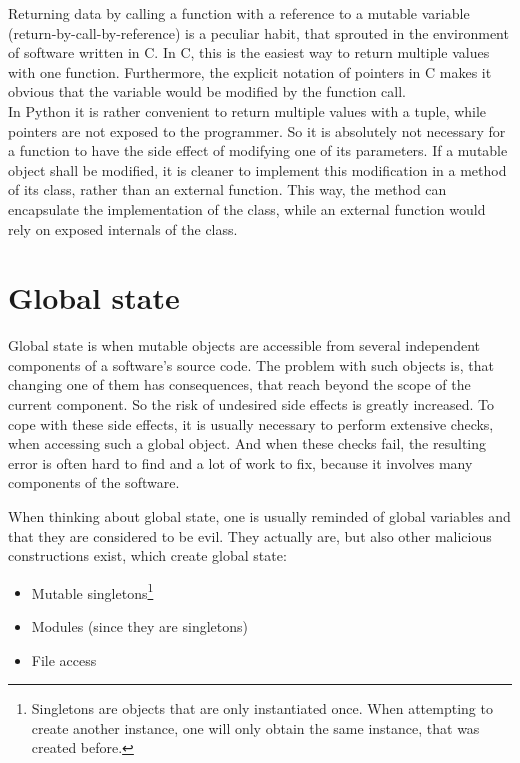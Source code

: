 		Returning data by calling a function with a reference to a mutable variable (return-by-call-by-reference) is a peculiar habit, that sprouted in the environment of software written in C.
		In C, this is the easiest way to return multiple values with one function.
		Furthermore, the explicit notation of pointers in C makes it obvious that the variable would be modified by the function call.\\
		In Python it is rather convenient to return multiple values with a tuple, while pointers are not exposed to the programmer.
		So it is absolutely not necessary for a function to have the side effect of modifying one of its parameters.
		If a mutable object shall be modified, it is cleaner to implement this modification in a method of its class, rather than an external function.
		This way, the method can encapsulate the implementation of the class, while an external function would rely on exposed internals of the class.


	\section{Global state}
		Global state is when mutable objects are accessible from several independent components of a software's source code.
		The problem with such objects is, that changing one of them has consequences, that reach beyond the scope of the current component.
		So the risk of undesired side effects is greatly increased.
		To cope with these side effects, it is usually necessary to perform extensive checks, when accessing such a global object.
		And when these checks fail, the resulting error is often hard to find and a lot of work to fix, because it involves many components of the software.

		When thinking about global state, one is usually reminded of global variables and that they are considered to be evil.
		They actually are, but also other malicious constructions exist, which create global state:
		\begin{itemize}
			\item Mutable singletons\footnote{Singletons are objects that are only instantiated once. When attempting to create another instance, one will only obtain the same instance, that was created before.}
			\item Modules (since they are singletons)
			\item File access
		\end{itemize}

